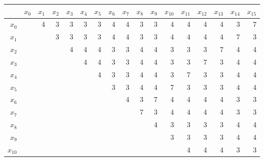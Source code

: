 \begin{tabular}{| r | r | r | r | r | r | r | r | r | r | r | r | r | r | r | r | r |} \hline & $x_{0}$ & $x_{1}$ & $x_{2}$ & $x_{3}$ & $x_{4}$ & $x_{5}$ & $x_{6}$ & $x_{7}$ & $x_{8}$ & $x_{9}$ & $x_{10}$ & $x_{11}$ & $x_{12}$ & $x_{13}$ & $x_{14}$ & $x_{15}$\\ \hline $x_{0}$ & \diagbox{　}{　}& 4 & 3 & 3 & 3 & 3 & 4 & 4 & 3 & 3 & 4 & 4 & 4 & 4 & 3 & 7 \\ \hline 
 $x_{1}$ & \diagbox{　}{　}& \diagbox{　}{　}& 3 & 3 & 3 & 3 & 4 & 4 & 3 & 3 & 4 & 4 & 4 & 4 & 7 & 3 \\ \hline 
 $x_{2}$ & \diagbox{　}{　}& \diagbox{　}{　}& \diagbox{　}{　}& 4 & 4 & 4 & 3 & 3 & 4 & 4 & 3 & 3 & 3 & 7 & 4 & 4 \\ \hline 
 $x_{3}$ & \diagbox{　}{　}& \diagbox{　}{　}& \diagbox{　}{　}& \diagbox{　}{　}& 4 & 4 & 3 & 3 & 4 & 4 & 3 & 3 & 7 & 3 & 4 & 4 \\ \hline 
 $x_{4}$ & \diagbox{　}{　}& \diagbox{　}{　}& \diagbox{　}{　}& \diagbox{　}{　}& \diagbox{　}{　}& 4 & 3 & 3 & 4 & 4 & 3 & 7 & 3 & 3 & 4 & 4 \\ \hline 
 $x_{5}$ & \diagbox{　}{　}& \diagbox{　}{　}& \diagbox{　}{　}& \diagbox{　}{　}& \diagbox{　}{　}& \diagbox{　}{　}& 3 & 3 & 4 & 4 & 7 & 3 & 3 & 3 & 4 & 4 \\ \hline 
 $x_{6}$ & \diagbox{　}{　}& \diagbox{　}{　}& \diagbox{　}{　}& \diagbox{　}{　}& \diagbox{　}{　}& \diagbox{　}{　}& \diagbox{　}{　}& 4 & 3 & 7 & 4 & 4 & 4 & 4 & 3 & 3 \\ \hline 
 $x_{7}$ & \diagbox{　}{　}& \diagbox{　}{　}& \diagbox{　}{　}& \diagbox{　}{　}& \diagbox{　}{　}& \diagbox{　}{　}& \diagbox{　}{　}& \diagbox{　}{　}& 7 & 3 & 4 & 4 & 4 & 4 & 3 & 3 \\ \hline 
 $x_{8}$ & \diagbox{　}{　}& \diagbox{　}{　}& \diagbox{　}{　}& \diagbox{　}{　}& \diagbox{　}{　}& \diagbox{　}{　}& \diagbox{　}{　}& \diagbox{　}{　}& \diagbox{　}{　}& 4 & 3 & 3 & 3 & 3 & 4 & 4 \\ \hline 
 $x_{9}$ & \diagbox{　}{　}& \diagbox{　}{　}& \diagbox{　}{　}& \diagbox{　}{　}& \diagbox{　}{　}& \diagbox{　}{　}& \diagbox{　}{　}& \diagbox{　}{　}& \diagbox{　}{　}& \diagbox{　}{　}& 3 & 3 & 3 & 3 & 4 & 4 \\ \hline 
 $x_{10}$ & \diagbox{　}{　}& \diagbox{　}{　}& \diagbox{　}{　}& \diagbox{　}{　}& \diagbox{　}{　}& \diagbox{　}{　}& \diagbox{　}{　}& \diagbox{　}{　}& \diagbox{　}{　}& \diagbox{　}{　}& \diagbox{　}{　}& 4 & 4 & 4 & 3 & 3 \\ \hline 

\end{tabular}
